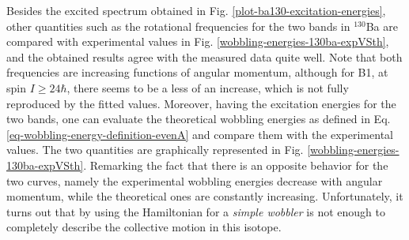 Besides the excited spectrum obtained in Fig. \ref{plot-ba130-excitation-energies}, other quantities such as the rotational frequencies for the two bands in $^{130}$Ba are compared with experimental values in Fig. \ref{wobbling-energies-130ba-expVSth}, and the obtained results agree with the measured data quite well. Note that both frequencies are increasing functions of angular momentum, although for B1, at spin $I\geq 24\hbar$, there seems to be a less of an increase, which is not fully reproduced by the fitted values. Moreover, having the excitation energies for the two bands, one can evaluate the theoretical wobbling energies as defined in Eq. \ref{eq-wobbling-energy-definition-evenA} and compare them with the experimental values. The two quantities are graphically represented in Fig. \ref{wobbling-energies-130ba-expVSth}. Remarking the fact that there is an opposite behavior for the two curves, namely the experimental wobbling energies decrease with angular momentum, while the theoretical ones are constantly increasing. Unfortunately, it turns out that by using the Hamiltonian for a \emph{simple wobbler} is not enough to completely describe the collective motion in this isotope.

